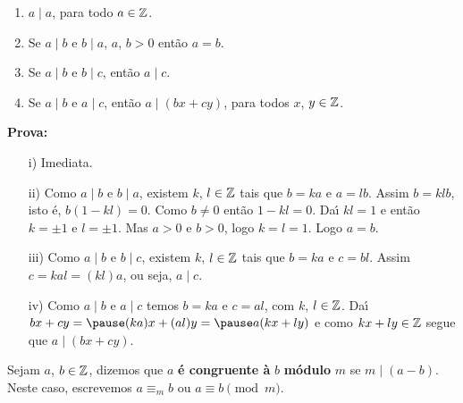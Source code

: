\documentclass{beamer}
\begin{document}
    \begin{frame}
        \begin{proposicao}
            \begin{enumerate}[label={\roman*})]
                \item $a\mid a$, para todo $a \in \mathbb{Z}$.\pause \vspace{.3cm}
                \item Se $a\mid b$ e $b\mid a$, $a$, $b > 0$ ent\~ao $a = b$.\pause \vspace{.3cm}
                \item Se $a\mid b$ e $b\mid c$, ent{\~a}o $a\mid c$.\pause \vspace{.3cm}
                \item Se $a\mid b$ e $a\mid c$, ent{\~a}o $a\mid (bx+cy)$, para todos $x$, $y \in \mathbb{Z}$.\pause \vspace{.3cm}
            \end{enumerate}
        \end{proposicao}
        \noindent \textbf{Prova:}
        \begin{enumerate}
            \item[i)] Imediata.\pause \vspace{.3cm}
            
            \item[ii)] Como $a\mid b$ e $b\mid a$, \pause existem $k$, $l \in \mathbb{Z} $ \pause tais que $b = ka$ \pause e $a = lb$. \pause Assim $b = klb$, \pause isto \'e, $b(1 - kl) = 0$. \pause Como $b \ne 0$ \pause ent\~ao $1 - kl = 0$. \pause Da{\'\i} $kl = 1$ \pause e ent\~ao $k = \pm 1$ \pause e $l = \pm 1$. \pause Mas $a > 0$ e $b > 0$, \pause logo $k = l =1$. \pause Logo $a = b$.\pause \vspace{.3cm}
        \end{enumerate}
    \end{frame}
    \begin{frame}
        \begin{enumerate}
            \item[iii)] Como $a\mid b$ e $b\mid c$, \pause existem $k$, $l \in \mathbb{Z}$ \pause tais que $b = ka$ \pause e $c = bl$. \pause Assim  $c = kal = (kl)a$, \pause ou seja, $a\mid c$.\pause \vspace{.3cm}

            \item[iv)] Como $a\mid b$ e $a\mid c$ \pause temos $b = ka$ e $c = al$, \pause com $k$, $l \in \mathbb{Z}$. \pause Da{\'\i} $bx + cy = \pause (ka)x + (al)y = \pause a(kx + ly)$ \pause e como $kx + ly \in \mathbb{Z}$ \pause segue que $a \mid (bx + cy)$.\hspace{.5cm} \qedsymbol\pause
        \end{enumerate}

        \begin{definicao}
            Sejam $a$, $b \in\mathbb{Z}$, \pause dizemos que $a$ \textbf{{\'e} congruente \`a} $b$ \pause \textbf{m{\'o}dulo} $m$ \pause se $m \mid (a-b)$. \pause Neste caso, escrevemos $a\equiv_{m} b$ \pause ou $a\equiv b \pmod{m}$.\pause
        \end{definicao}
    \end{frame}
\end{document}
